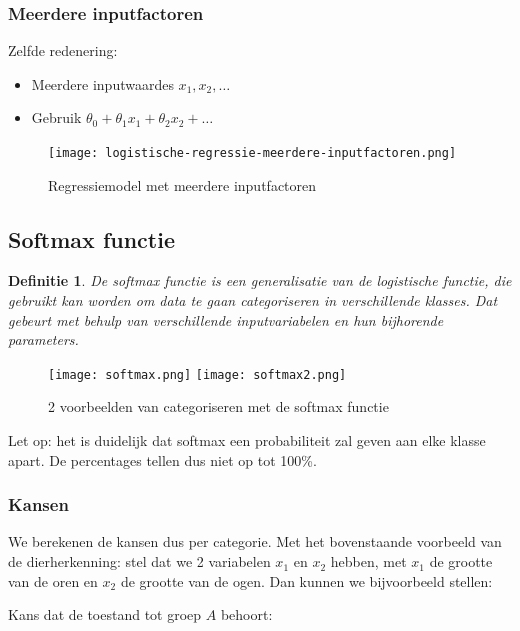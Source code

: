 \documentclass{article}
\newtheorem{theorem}{Definitie}[section]
\begin{document}
\subsubsection{Meerdere inputfactoren}

Zelfde redenering:

\begin{itemize}
    \item Meerdere inputwaardes $x_1, x_2, \dots$
    \item Gebruik $\theta_0 + \theta_1x_1 + \theta_2x_2 + \dots$
\end{itemize}

\begin{figure}[H]
    \centering
    \texttt{[image: logistische-regressie-meerdere-inputfactoren.png]}
    \caption{Regressiemodel met meerdere inputfactoren}
\end{figure}


\subsection{Softmax functie}

\begin{theorem}
    De softmax functie is een generalisatie van de logistische functie, die gebruikt kan worden om data
    te gaan categoriseren in verschillende klasses. Dat gebeurt met behulp van verschillende inputvariabelen en
    hun bijhorende parameters.
\end{theorem}

\begin{figure}[H]
    \centering
    \texttt{[image: softmax.png]}
    \texttt{[image: softmax2.png]}
    \caption{2 voorbeelden van categoriseren met de softmax functie}
\end{figure}

Let op: het is duidelijk dat softmax een probabiliteit zal geven aan elke klasse apart. 
De percentages tellen dus niet op tot 100\%.

\subsubsection{Kansen}

We berekenen de kansen dus per categorie. Met het bovenstaande voorbeeld van de dierherkenning: 
stel dat we 2 variabelen $x_1$ en $x_2$ hebben, met $x_1$ de grootte van de oren
en $x_2$ de grootte van de ogen. Dan kunnen we bijvoorbeeld stellen:

Kans dat de toestand tot groep $A$ behoort:
\end{document}
